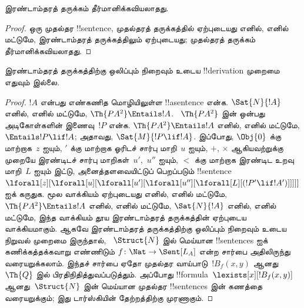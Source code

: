 \documentclass[../../../include/open-logic-section]{subfiles}
\begin{document}



\begin{thm}
இரண்டாம்தரத் தருக்கம் தீர்மானிக்கவியலாதது.
\end{thm}

\begin{proof}
ஒரு முதல்தர !!{sentence}, முதல்தரத் தருக்கத்தில் ஏற்புடையது எனில்,
எனில் மட்டுமே, இரண்டாம்தரத் தருக்கத்திலும் ஏற்புடையது; முதல்தரத்
தருக்கம் தீர்மானிக்கவியலாதது.
\end{proof}

\begin{thm}
இரண்டாம்தரத் தருக்கத்திற்கு ஒலிப்பும் நிறைவும் உடைய !!{derivation}
முறைமை எதுவும் இல்லை.
\end{thm}

\begin{proof}
$!A$ என்பது எண்கணித மொழியிலுள்ள !!a{sentence} என்க.
$\Sat{N}{!A}$ எனில், எனில் மட்டுமே, $\Th{PA^2} \Entails !A$.
~$\Th{PA^2}$ இன் ஒன்பது அடிகோள்களின் இணைவு~$!P$ என்க.
$\Th{PA^2} \Entails !A$ எனில், எனில் மட்டுமே,
$\Entails !P \lif !A$; அதாவது,
$\Sat{M}{!P \lif !A}$. இப்போது, $\Obj{0}$ க்கு மாற்றாக~$z$ ஐயும்,
$\prime$ க்கு மாற்றாக ஓரிடச் சார்பு மாறி~$u$ ஐயும்,
$+$, $\times$ ஆகியவற்றுக்கு முறையே இரண்டிடச் சார்பு
மாறிகள்~$u'$,~$u''$ ஐயும், $<$ க்கு மாற்றாக இரண்டிட உறவு
மாறி~$L$ ஐயும் இட்டு, அனைத்தளவையிட்டுப் பெறப்படும்
!!{sentence}
$\lforall[z][\lforall[u][\lforall[u'][\lforall[u''][\lforall[L][(!P' \lif !A')]]]]]$
ஐக் கருதுக. மூல வாக்கியம் ஏற்புடையது எனில், எனில் மட்டுமே,
$\Th{PA^2} \Entails !A$ எனில், எனில் மட்டுமே,
$\Sat{N}{!A}$ எனில், எனில் மட்டுமே, இந்த வாக்கியம் தூய
இரண்டாம்தரத் தருக்கத்தின் ஏற்புடைய வாக்கியமாகும். ஆகவே இரண்டாம்தரத்
தருக்கத்திற்கு ஒலிப்பும் நிறைவும் உடைய நிறுவல் முறைமை இருந்தால்,
~$\Struct{N}$ இல் மெய்யான !!{sentence}s ஐக் கணிக்கத்தக்கவாறு
எண்ணிடும் $f\colon \Nat \to \Sent[L_A]$ என்ற சார்பை அதிலிருந்து
வரையறுக்கலாம். இந்தச் சார்பை ஏதோ முதல்தர வாய்பாடு~$!B_f(x, y)$
ஆனது~$\Th{Q}$ இல் பிரதிநிதித்துவப்படுத்தும். அப்போது
!!{formula}~$\lexists[x][!B_f(x, y)]$ ஆனது~$\Struct{N}$ இன் மெய்யான
முதல்தர !!{sentence}s இன் கணத்தை வரையறுக்கும்; இது டார்ஸ்கியின்
தேற்றத்திற்கு முரணாகும்.
\end{proof}
\end{document}
